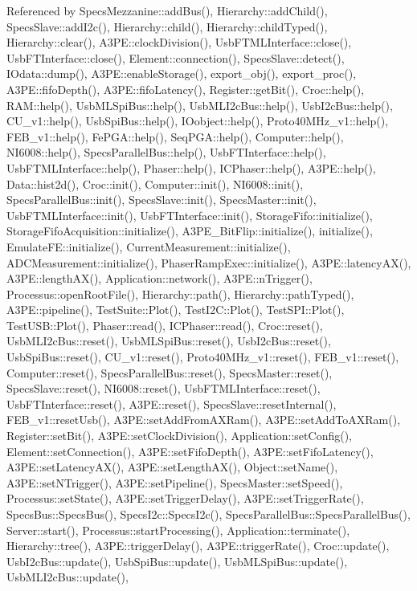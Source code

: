 Referenced by Specs\+Mezzanine\+::add\+Bus(), Hierarchy\+::add\+Child(), Specs\+Slave\+::add\+I2c(), Hierarchy\+::child(), Hierarchy\+::child\+Typed(), Hierarchy\+::clear(), A3\+P\+E\+::clock\+Division(), Usb\+F\+T\+M\+L\+Interface\+::close(), Usb\+F\+T\+Interface\+::close(), Element\+::connection(), Specs\+Slave\+::detect(), I\+Odata\+::dump(), A3\+P\+E\+::enable\+Storage(), export\+\_\+obj(), export\+\_\+proc(), A3\+P\+E\+::fifo\+Depth(), A3\+P\+E\+::fifo\+Latency(), Register\+::get\+Bit(), Croc\+::help(), R\+A\+M\+::help(), Usb\+M\+L\+Spi\+Bus\+::help(), Usb\+M\+L\+I2c\+Bus\+::help(), Usb\+I2c\+Bus\+::help(), C\+U\+\_\+v1\+::help(), Usb\+Spi\+Bus\+::help(), I\+Oobject\+::help(), Proto40\+M\+Hz\+\_\+v1\+::help(), F\+E\+B\+\_\+v1\+::help(), Fe\+P\+G\+A\+::help(), Seq\+P\+G\+A\+::help(), Computer\+::help(), N\+I6008\+::help(), Specs\+Parallel\+Bus\+::help(), Usb\+F\+T\+Interface\+::help(), Usb\+F\+T\+M\+L\+Interface\+::help(), Phaser\+::help(), I\+C\+Phaser\+::help(), A3\+P\+E\+::help(), Data\+::hist2d(), Croc\+::init(), Computer\+::init(), N\+I6008\+::init(), Specs\+Parallel\+Bus\+::init(), Specs\+Slave\+::init(), Specs\+Master\+::init(), Usb\+F\+T\+M\+L\+Interface\+::init(), Usb\+F\+T\+Interface\+::init(), Storage\+Fifo\+::initialize(), Storage\+Fifo\+Acquisition\+::initialize(), A3\+P\+E\+\_\+\+Bit\+Flip\+::initialize(), initialize(), Emulate\+F\+E\+::initialize(), Current\+Measurement\+::initialize(), A\+D\+C\+Measurement\+::initialize(), Phaser\+Ramp\+Exec\+::initialize(), A3\+P\+E\+::latency\+A\+X(), A3\+P\+E\+::length\+A\+X(), Application\+::network(), A3\+P\+E\+::n\+Trigger(), Processus\+::open\+Root\+File(), Hierarchy\+::path(), Hierarchy\+::path\+Typed(), A3\+P\+E\+::pipeline(), Test\+Suite\+::\+Plot(), Test\+I2\+C\+::\+Plot(), Test\+S\+P\+I\+::\+Plot(), Test\+U\+S\+B\+::\+Plot(), Phaser\+::read(), I\+C\+Phaser\+::read(), Croc\+::reset(), Usb\+M\+L\+I2c\+Bus\+::reset(), Usb\+M\+L\+Spi\+Bus\+::reset(), Usb\+I2c\+Bus\+::reset(), Usb\+Spi\+Bus\+::reset(), C\+U\+\_\+v1\+::reset(), Proto40\+M\+Hz\+\_\+v1\+::reset(), F\+E\+B\+\_\+v1\+::reset(), Computer\+::reset(), Specs\+Parallel\+Bus\+::reset(), Specs\+Master\+::reset(), Specs\+Slave\+::reset(), N\+I6008\+::reset(), Usb\+F\+T\+M\+L\+Interface\+::reset(), Usb\+F\+T\+Interface\+::reset(), A3\+P\+E\+::reset(), Specs\+Slave\+::reset\+Internal(), F\+E\+B\+\_\+v1\+::reset\+Usb(), A3\+P\+E\+::set\+Add\+From\+A\+X\+Ram(), A3\+P\+E\+::set\+Add\+To\+A\+X\+Ram(), Register\+::set\+Bit(), A3\+P\+E\+::set\+Clock\+Division(), Application\+::set\+Config(), Element\+::set\+Connection(), A3\+P\+E\+::set\+Fifo\+Depth(), A3\+P\+E\+::set\+Fifo\+Latency(), A3\+P\+E\+::set\+Latency\+A\+X(), A3\+P\+E\+::set\+Length\+A\+X(), Object\+::set\+Name(), A3\+P\+E\+::set\+N\+Trigger(), A3\+P\+E\+::set\+Pipeline(), Specs\+Master\+::set\+Speed(), Processus\+::set\+State(), A3\+P\+E\+::set\+Trigger\+Delay(), A3\+P\+E\+::set\+Trigger\+Rate(), Specs\+Bus\+::\+Specs\+Bus(), Specs\+I2c\+::\+Specs\+I2c(), Specs\+Parallel\+Bus\+::\+Specs\+Parallel\+Bus(), Server\+::start(), Processus\+::start\+Processing(), Application\+::terminate(), Hierarchy\+::tree(), A3\+P\+E\+::trigger\+Delay(), A3\+P\+E\+::trigger\+Rate(), Croc\+::update(), Usb\+I2c\+Bus\+::update(), Usb\+Spi\+Bus\+::update(), Usb\+M\+L\+Spi\+Bus\+::update(), Usb\+M\+L\+I2c\+Bus\+::update(), 
